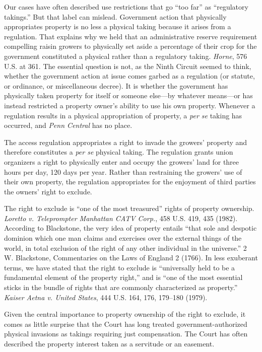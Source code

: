 Our cases have often described use restrictions that go ``too far'' as
``regulatory takings.'' But that label can mislead. Government action that
physically appropriates property is no less a physical taking because it arises
from a regulation. That explains why we held that an administrative reserve
requirement compelling raisin growers to physically set aside a percentage of
their crop for the government constituted a physical rather than a regulatory
taking. \textit{Horne}, 576 U.S. at 361. The essential question is not, as the
Ninth Circuit seemed to think, whether the government action at issue comes
garbed as a regulation (or statute, or ordinance, or miscellaneous decree). It
is whether the government has physically taken property for itself or someone
else---by whatever means---or has instead restricted a property owner's ability
to use his own property. Whenever a regulation results in a physical
appropriation of property, a \textit{per se} taking has occurred, and
\textit{Penn Central} has no place.



The access regulation appropriates a right to invade the growers' property and
therefore constitutes a \textit{per se} physical taking. The regulation grants
union organizers a right to physically enter and occupy the growers' land for
three hours per day, 120 days per year. Rather than restraining the growers' use
of their own property, the regulation appropriates for the enjoyment of third
parties the owners' right to exclude.


The right to exclude is ``one of the most treasured'' rights of property
ownership. \textit{Loretto v. Teleprompter Manhattan CATV Corp.}, 458 U.S. 419,
435 (1982). According to Blackstone, the very idea of property entails ``that
sole and despotic dominion which one man claims and exercises over the external
things of the world, in total exclusion of the right of any other individual in
the universe.'' 2 W. Blackstone, Commentaries on the Laws of England 2 (1766).
In less exuberant terms, we have stated that the right to exclude is
``universally held to be a fundamental element of the property right,'' and is
``one of the most essential sticks in the bundle of rights that are commonly
characterized as property.'' \textit{Kaiser Aetna v. United States}, 444 U.S.
164, 176, 179--180 (1979).


Given the central importance to property ownership of the right to exclude, it
comes as little surprise that the Court has long treated government-authorized
physical invasions as takings requiring just compensation. The Court has often
described the property interest taken as a servitude or an easement.


